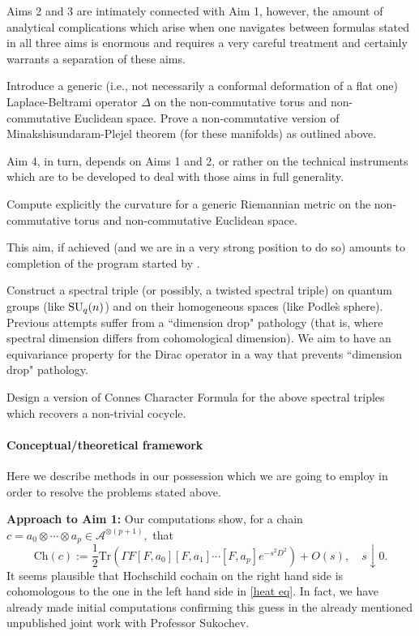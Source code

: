 \documentclass[12pt]{article}
\begin{document}
Aims 2 and 3 are intimately connected with Aim 1, however, the amount of analytical complications which arise when one navigates between formulas stated in all three aims is enormous and requires a very careful treatment and certainly warrants a separation of these aims.

 Introduce a generic (i.e., not necessarily a conformal deformation of a flat one) Laplace-Beltrami operator $\Delta$ on the non-commutative torus and non-commutative Euclidean space. Prove a non-commutative version of Minakshisundaram-Plejel theorem (for these manifolds) as outlined above.

Aim 4, in turn, depends on Aims 1 and 2, or rather on the technical instruments which are to be developed to deal with those aims in full generality.

 Compute explicitly the curvature for a generic Riemannian metric on the non-commutative torus and non-commutative Euclidean space.

This aim, if achieved (and we are in a very strong position to do so) amounts to completion of the program started by \cite{ChakrabortyPal,Connes-suq2,NeshTus}.

 Construct a spectral triple (or possibly, a twisted spectral triple) on quantum groups (like ${\rm SU}_q(n)$) and on their homogeneous spaces (like Podle\`s sphere). Previous attempts \cite{ChakrabortyPal} suffer from a ``dimension drop" pathology (that is, where spectral dimension differs from cohomological dimension). We aim to have an equivariance property for the Dirac operator in a way that prevents ``dimension drop" pathology. 


 Design a version of Connes Character Formula for the above spectral triples which recovers a non-trivial cocycle.

\paragraph*{Conceptual/theoretical framework} Here we describe methods in our possession which we are going to employ in order to resolve the problems stated above.



{\bf Approach to Aim 1:} Our computations show, for a chain $c=a_0\otimes\cdots\otimes a_p\in\mathcal{A}^{\otimes (p+1)},$ that
$$\mathrm{Ch}(c) := \frac{1}{2}\mathrm{Tr}(\Gamma F[F,a_0][F,a_1]\cdots[F,a_p]e^{-s^2D^2})+O(s),\quad s\downarrow 0.$$
It seems plausible that Hochschild cochain on the right hand side is cohomologous to the one in the left hand side in \eqref{heat eq}. In fact, we have already made initial computations confirming this guess in the already mentioned unpublished joint work with Professor Sukochev.
\end{document}
